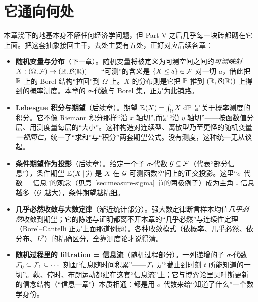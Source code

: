 
\section{它通向何处}
\label{sec:measure-beyond}

本章浇下的地基本身不解任何经济学问题，但 Part V 之后几乎每一块砖都砌在它上面。把这套抽象接回主干，去处主要有五处，正好对应后续各章：

\begin{itemize}
    \item \textbf{随机变量与分布}（下一章）。随机变量将被定义为可测空间之间的\emph{可测映射} $X:(\Omega,\mathcal{F})\to(\mathbb{R},\mathcal{B}(\mathbb{R}))$——``可测''的含义是 $\left\{X\le a\right\}\in\mathcal{F}$ 对一切 $a$，借此把 $\mathbb{R}$ 上的 Borel 结构``拉回''到 $\Omega$ 上。$X$ 的分布则是它把 $\mathbb{P}$ 推到 $(\mathbb{R},\mathcal{B}(\mathbb{R}))$ 上得到的概率测度。本章的 $\sigma$-代数与 Borel 集，正是为此铺路。
    \item \textbf{Lebesgue 积分与期望}（后续章）。期望 $\mathbb{E}_{}\!\left(X\right)=\int_\Omega X\,\mathop{}\!\mathrm{d}\mathbb{P}$ 是关于概率测度的积分。它不像 Riemann 积分那样``沿 $x$ 轴切'',而是``沿 $y$ 轴切''——按函数值分层、用测度量每层的``大小''。这种构造对连续型、离散型乃至更怪的随机变量\emph{一视同仁}，统一了``求和''与``积分''两套期望公式。没有测度，这种统一无从谈起。
    \item \textbf{条件期望作为投影}（后续章）。给定一个子 $\sigma$-代数 $\mathcal{G}\subseteq\mathcal{F}$（代表``部分信息''），条件期望 $\mathbb{E}_{}\!\left(X\,\middle|\,\mathcal{G}\right)$ 是 $X$ 在 $\mathcal{G}$-可测函数空间上的正交投影。这里``$\sigma$-代数 = 信息''的观念（见第~\ref{sec:measure-sigma} 节的两极例子）成为主角：信息越多（$\mathcal{G}$ 越大），条件期望越精细。
    \item \textbf{几乎必然收敛与大数定律}（渐近统计部分）。强大数定律断言样本均值\emph{几乎必然}收敛到期望；它的陈述与证明都离不开本章的``几乎必然''与连续性定理（Borel--Cantelli 正是上面那道例题）。各种收敛模式（依概率、几乎必然、依分布、$L^p$）的精确区分，全靠测度论才说得清。
    \item \textbf{随机过程里的 filtration = 信息流}（随机过程部分）。一列递增的子 $\sigma$-代数 $\mathcal{F}_0\subseteq\mathcal{F}_1\subseteq\cdots$ 刻画``信息随时间积累''——$\mathcal{F}_t$ 是``截止到时刻 $t$ 所能知道的一切''。鞅、停时、布朗运动都建在这套``信息流''上；它与博弈论里贝叶斯更新的信念结构（``信息一章''）本质相通：都是用 $\sigma$-代数来给``知道了什么''一个数学身份。
\end{itemize}

